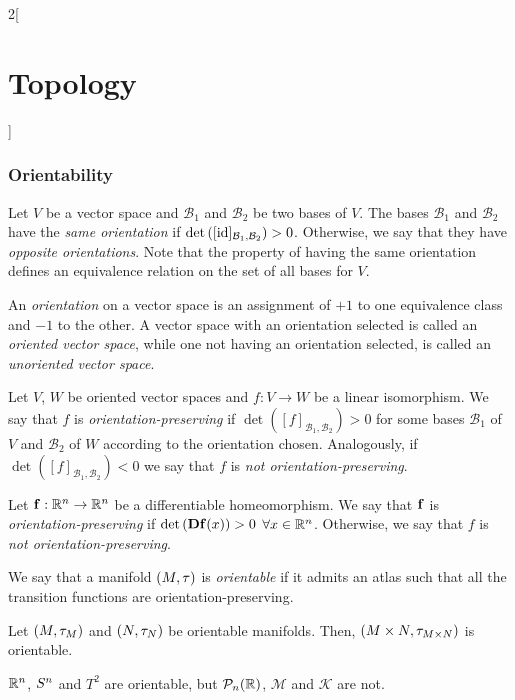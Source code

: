 \documentclass[../../../main_math.tex]{subfiles}
\begin{document}
\begin{multicols}{2}[\section{Topology}]
  \subsubsection{Orientability}
  \begin{definition}
    Let $V$ be a vector space and $\mathcal{B}_1$ and $\mathcal{B}_2$ be two bases of $V$. The bases $\mathcal{B}_1$ and $\mathcal{B}_2$ have the \emph{same orientation} if $\det\left([\id]_{\mathcal{B}_1,\mathcal{B}_2}\right)>0$. Otherwise, we say that they have \emph{opposite orientations}. Note that the property of having the same orientation defines an equivalence relation on the set of all bases for $V$.
  \end{definition}
  \begin{definition}
    An \emph{orientation} on a vector space is an assignment of $+1$ to one equivalence class and $-1$ to the other. A vector space with an orientation selected is called an \emph{oriented vector space}, while one not having an orientation selected, is called an \emph{unoriented vector space}.
  \end{definition}
  \begin{definition}
    Let $V$, $W$ be oriented vector spaces and $f:V\rightarrow W$ be a linear isomorphism. We say that $f$ is \emph{orientation-preserving} if $\det \left([f]_{\mathcal{B}_1,\mathcal{B}_2}\right)>0$ for some bases $\mathcal{B}_1$ of $V$ and $\mathcal{B}_2$ of $W$ according to the orientation chosen. Analogously, if $\det \left([f]_{\mathcal{B}_1,\mathcal{B}_2}\right)<0$ we say that $f$ is \emph{not orientation-preserving}.
  \end{definition}
  \begin{definition}
    Let $\vf{f}:\RR^n\rightarrow\RR^n$ be a differentiable homeomorphism. We say that $\vf{f}$ is \emph{orientation-preserving} if $\det \left(\vf{Df}(x)\right)>0$ $\forall x\in\RR^n$. Otherwise, we say that $f$ is \emph{not orientation-preserving}.
  \end{definition}
  \begin{definition}
    We say that a manifold $(M,\topo)$ is \emph{orientable} if it admits an atlas such that all the transition functions are orientation-preserving.
  \end{definition}
  \begin{proposition}
    Let $(M,\topo_M)$ and $(N,\topo_N)$ be orientable manifolds. Then, $(M\times N,\topo_{M\times N})$ is orientable.
  \end{proposition}
  \begin{proposition}
    $\RR^n$, $\S^n$ and $T^2$ are orientable, but $\mathcal{P}_n(\RR)$, $\mathcal{M}$ and $\mathcal{K}$ are not.
  \end{proposition}

\end{multicols}
\end{document}
